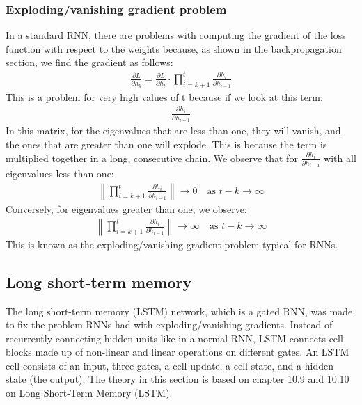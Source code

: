 \documentclass[a4paper,12pt]{article}
\begin{document}
\subsubsection{Exploding/vanishing gradient problem}
In a standard RNN, there are problems with computing the gradient of the loss function with respect to the weights because, as shown in the backpropagation section, we find the gradient as follows:
\begin{align}
\frac{\partial L}{\partial h_k} = \frac{\partial L}{\partial h_t} \cdot \prod_{i=k+1}^{t} \frac{\partial h_i}{\partial h_{i-1}}
\end{align}
This is a problem for very high values of t because if we look at this term:
\begin{align}
\frac{\partial h_i}{\partial h_{i-1}}
\end{align}
In this matrix, for the eigenvalues that are less than one, they will vanish, and the ones that are greater than one will explode. This is because the term is multiplied together in a long, consecutive chain.
We observe that for $\frac{\partial h_i}{\partial h_{i-1}}$ with all eigenvalues less than one:
\begin{align}
\left\| \prod_{i=k+1}^{t} \frac{\partial h_i}{\partial h_{i-1}} \right\| \to 0 \quad \text{as } t - k \to \infty
\end{align}
Conversely, for eigenvalues greater than one, we observe:
\begin{align}
\left\| \prod_{i=k+1}^{t} \frac{\partial h_i}{\partial h_{i-1}} \right\| \to \infty \quad \text{as } t - k \to \infty
\end{align}
This is known as the exploding/vanishing gradient problem typical for RNNs.
\subsection{Long short-term memory}
The long short-term memory (LSTM) network, which is a gated RNN, was made to fix the problem RNNs had with exploding/vanishing gradients.
Instead of recurrently connecting hidden units like in a normal RNN, LSTM connects cell blocks made up of non-linear and linear operations on different gates.
An LSTM cell consists of an input, three gates, a cell update, a cell state, and a hidden state (the output). The theory in this section is based on \cite{Goodfellow-et-al-2016} chapter 10.9 and 10.10 on Long Short-Term Memory (LSTM).
\end{document}
